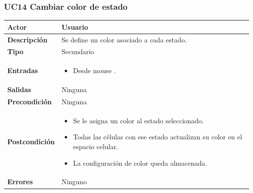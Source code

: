 \subsubsection{UC14 Cambiar color de estado}

\begin{table}[H]
\begin{center}
	\begin{tabular}{| p{} | p{} |}
		\hline 
			\textbf{Actor} & Usuario \\ \hline
			\textbf{Descripción} & Se define un color asociado a cada estado.  \\ \hline
			\textbf{Tipo} & Secundario \\ \hline
			\textbf{Entradas} &
			\begin{itemize}[noitemsep, nosep]
			\item Desde mouse \BTN{estado}.
				\end{itemize}
			\\ \hline
			\textbf{Salidas} & Ninguna  \\ \hline
			\textbf{Precondición} & Ninguna  \\ \hline
			\textbf{Postcondición} &  
			\begin{itemize}[noitemsep, nosep]
				\item Se le asigna un color al estado seleccionado.
				\item Todas las células con ese estado actualizan su color en el espacio celular.
				\item La configuración de color queda almacenada.
			\end{itemize}  \\ \hline
			\textbf{Errores} & Ninguno \\ \hline
			\end{tabular}
			\end{center}
			\end{table}
			
